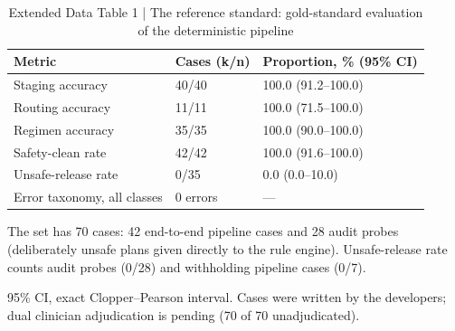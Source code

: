 \begin{table}[t]
\small
\caption{Extended Data Table 1 | The reference standard: gold-standard evaluation of the deterministic pipeline}
\begin{tabular}{p{5.0cm}p{2.4cm}p{3.6cm}}
\toprule
Metric & Cases (k/n) & Proportion, \% (95\% CI) \\
\midrule
Staging accuracy & 40/40 & 100.0 (91.2--100.0) \\
Routing accuracy & 11/11 & 100.0 (71.5--100.0) \\
Regimen accuracy & 35/35 & 100.0 (90.0--100.0) \\
Safety-clean rate & 42/42 & 100.0 (91.6--100.0) \\
Unsafe-release rate & 0/35 & 0.0 (0.0--10.0) \\
Error taxonomy, all classes & 0 errors & — \\
\bottomrule
\end{tabular}
\par\footnotesize The set has 70 cases: 42 end-to-end pipeline cases and 28 audit probes (deliberately unsafe plans given directly to the rule engine). Unsafe-release rate counts audit probes (0/28) and withholding pipeline cases (0/7).
\par\footnotesize 95\% CI, exact Clopper--Pearson interval. Cases were written by the developers; dual clinician adjudication is pending (70 of 70 unadjudicated).
\end{table}
